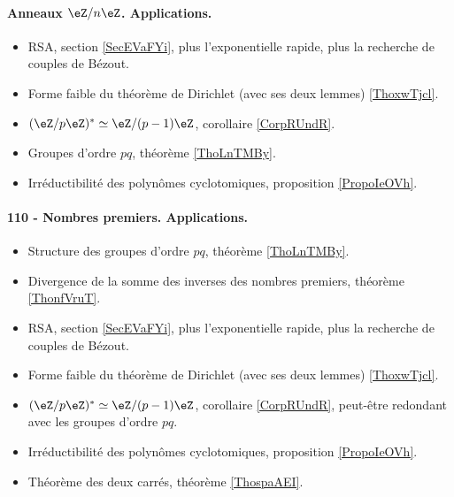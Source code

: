 \paragraph{Anneaux $\eZ/n\eZ$. Applications.}
\begin{itemize}
    \item RSA, section \ref{SecEVaFYi}, plus l'exponentielle rapide, plus la recherche de couples de Bézout.
    \item Forme faible du théorème de Dirichlet (avec ses deux lemmes) \ref{ThoxwTjcl}.
    \item \( (\eZ/p\eZ)^*\simeq \eZ/(p-1)\eZ\), corollaire \ref{CorpRUndR}.
    \item Groupes d'ordre \( pq\), théorème \ref{ThoLnTMBy}.
    \item Irréductibilité des polynômes cyclotomiques, proposition \ref{PropoIeOVh}.
\end{itemize}

\paragraph{110 - Nombres premiers. Applications.}
\begin{itemize}
    \item Structure des groupes d'ordre \( pq\), théorème \ref{ThoLnTMBy}.
    \item Divergence de la somme des inverses des nombres premiers, théorème \ref{ThonfVruT}.
    \item RSA, section \ref{SecEVaFYi}, plus l'exponentielle rapide, plus la recherche de couples de Bézout.
    \item Forme faible du théorème de Dirichlet (avec ses deux lemmes) \ref{ThoxwTjcl}.
    \item \( (\eZ/p\eZ)^*\simeq \eZ/(p-1)\eZ\), corollaire \ref{CorpRUndR}, peut-être redondant avec les groupes d'ordre \( pq\).
    \item Irréductibilité des polynômes cyclotomiques, proposition \ref{PropoIeOVh}.
    \item Théorème des deux carrés, théorème \ref{ThospaAEI}.
\end{itemize}
